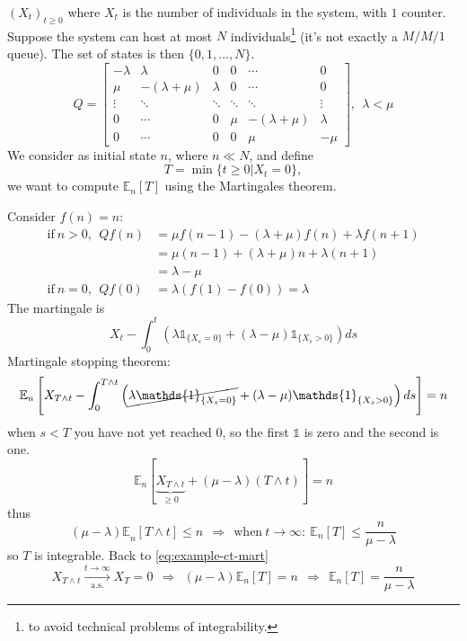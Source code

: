 \documentclass[10pt,a4paper]{article}
\theoremstyle{definition}
\newcommand{\ind}{\mathds{1}}
\begin{document}
		$( X_{t})_{t\geq 0}$ where $X_{t}$ is the number of individuals in the system, with $1$ counter. Suppose the system can host at most $N$ individuals\footnote{to avoid technical problems of integrability.} (it's not exactly a $M/M/1$ queue). The set of states is then $\{0,1,\dotsc ,N\}$.
\begin{equation*}
	Q=\begin{bmatrix}
	-\lambda  & \lambda  & 0 & 0 & \cdots  & 0\\
	\mu  & -( \lambda +\mu ) & \lambda  & 0 & \cdots  & 0\\
	\vdots  & \ddots  & \ddots  & \ddots  & \ddots  & \vdots \\
	0 & \cdots  & 0 & \mu  & -( \lambda +\mu ) & \lambda \\
	0 & \cdots  & 0 & 0 & \mu  & -\mu 
	\end{bmatrix} ,\ \ \lambda < \mu 
\end{equation*}
We consider as initial state $n$, where $n\ll N$, and define
\begin{equation*}
	T=\min\{t\geq 0|X_{t} =0\} ,
\end{equation*}
we want to compute $\mathbb{E}_{n}[ T]$ using the Martingales theorem.

Consider $f( n) =n$:
\begin{align*}
	\text{if} \ n >0,\ \ Qf( n) & =\mu f( n-1) -( \lambda +\mu ) f( n) +\lambda f( n+1) \\
	                            & =\mu ( n-1) +( \lambda +\mu ) n+\lambda ( n+1)        \\
	                            & =\lambda -\mu                                         \\
	\text{if} \ n=0,\ \ Qf( 0)  & =\lambda ( f( 1) -f( 0)) =\lambda                     
\end{align*}
The martingale is
\begin{equation*}
	X_{t} -\int _{0}^{t}( \lambda \ind_{\{X_{s} =0\}} +( \lambda -\mu )\ind_{\{X_{s}  >0\}}) ds
\end{equation*}
Martingale stopping theorem:
\begin{equation*}
	\mathbb{E}_{n}\left[ X_{T\land t} -\int _{0}^{T\land t}\left(\cancel{\lambda \ind_{\{X_{s} =0\}}} +( \lambda -\mu )\ind_{\{X_{s}  >0\}}\right) ds\right] =n
\end{equation*}
when $s< T$ you have not yet reached $0$, so the first $\ind$ is zero and the second is one.
\begin{equation}
	\mathbb{E}_{n}[\underbrace{X_{T\land t}}_{\geq 0} +( \mu -\lambda )( T\land t)] =n
	\label{eq:example-ct-mart}
\end{equation}
thus
\begin{equation*}
	\mathbb{( \mu -\lambda ) E}_{n}[ T\land t] \leq n\ \ \Rightarrow \ \ \text{when} \ t\rightarrow \infty :\ \mathbb{E}_{n}[ T] \leq \frac{n}{\mu -\lambda }
\end{equation*}
so $T$ is integrable. Back to \eqref{eq:example-ct-mart}
\begin{equation*}
	X_{T\land t}\xrightarrow[\text{a.s.}]{t\rightarrow \infty } X_{T} =0\ \ \Rightarrow \ \ ( \mu -\lambda )\mathbb{E}_{n}[ T] =n\ \ \Rightarrow \ \ \mathbb{E}_{n}[ T] =\frac{n}{\mu -\lambda }
		\end{equation*}
		
		
\end{document}
